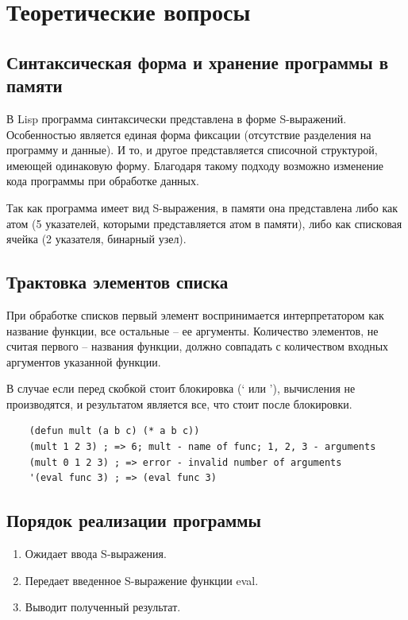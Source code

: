 \documentclass[14pt,a4paper]{scrreprt}
\begin{document}


\thispagestyle{empty}

\chapter{Теоретические вопросы}

\section{Синтаксическая форма и хранение программы в памяти}

В Lisp программа синтаксически представлена в форме S-выражений. Особенностью является единая форма фиксации (отсутствие разделения на программу и данные). И то, и другое представляется списочной структурой, имеющей одинаковую форму. Благодаря такому подходу возможно изменение кода программы при обработке данных.

Так как программа имеет вид S-выражения, в памяти она представлена либо как атом (5 указателей, которыми представляется атом в памяти), либо как списковая ячейка (2 указателя, бинарный узел).

\section{Трактовка элементов списка}

При обработке списков первый элемент воспринимается интерпретатором как название функции, все остальные -- ее аргументы. Количество элементов, не считая первого -- названия функции, должно совпадать с количеством входных аргументов указанной функции.

В случае если перед скобкой стоит блокировка (` или '), вычисления не производятся, и результатом является все, что стоит после блокировки.

\begin{lstlisting}
	(defun mult (a b c) (* a b c))
	(mult 1 2 3) ; => 6; mult - name of func; 1, 2, 3 - arguments
	(mult 0 1 2 3) ; => error - invalid number of arguments
	'(eval func 3) ; => (eval func 3)
\end{lstlisting}
\newpage

\section{Порядок реализации программы}

\begin{enumerate}
	\item Ожидает ввода S-выражения.
	\item Передает введенное S-выражение функции eval.
	\item Выводит полученный результат.
\end{enumerate}
\end{document}
